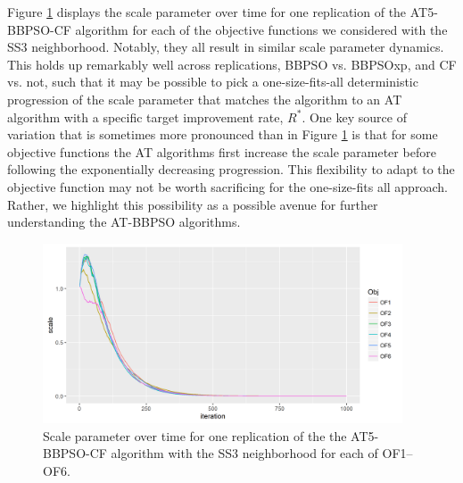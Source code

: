 \documentclass[cmbright]{staauth}
\begin{document}
Figure \ref{fig:scale} displays the scale parameter over time for one replication of the AT5-BBPSO-CF algorithm for each of the objective functions we considered with the SS3 neighborhood. Notably, they all result in similar scale parameter dynamics. This holds up remarkably well across replications, BBPSO vs. BBPSOxp, and CF vs. not, such that it may be possible to pick a one-size-fits-all deterministic progression of the scale parameter that matches the algorithm to an AT algorithm with a specific target improvement rate, $R^*$. One key source of variation that is sometimes more pronounced than in Figure \ref{fig:scale} is that for some objective functions the AT algorithms first increase the scale parameter before following the exponentially decreasing progression. This flexibility to adapt to the objective function may not be worth sacrificing for the one-size-fits all approach. Rather, we highlight this possibility as a possible avenue for further understanding the AT-BBPSO algorithms.

\begin{figure}[!ht]
\centering
\includegraphics[width=0.95\textwidth]{../code/psosims/scaleplot.png}
\caption{Scale parameter over time for one replication of the the AT5-BBPSO-CF algorithm with the SS3 neighborhood for each of OF1--OF6.}
\label{fig:scale}
\end{figure}








\end{document}
